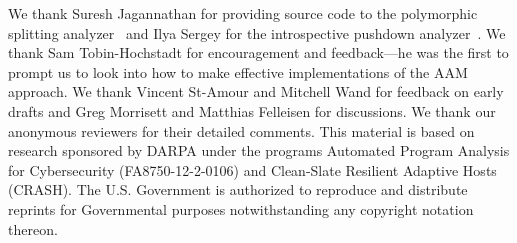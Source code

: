 \documentclass[9pt]{sigplanconf} %
\begin{document}
We thank Suresh Jagannathan for providing source code to the
polymorphic splitting
analyzer~\cite{dvanhorn:wright-jagannathan-toplas98} and Ilya Sergey
for the introspective pushdown
analyzer~\cite{dvanhorn:Earl2012Introspective}.  
%
We thank Sam Tobin-Hochstadt for encouragement and feedback---he was
the first to prompt us to look into how to make effective
implementations of the AAM approach.
%
We thank Vincent St-Amour and Mitchell Wand for feedback on early drafts
and Greg Morrisett and Matthias Felleisen for discussions.
%
We thank our anonymous reviewers for their detailed comments.
%
This material is based on research sponsored by DARPA under the
programs Automated Program Analysis for Cybersecurity
(FA8750-12-2-0106) and Clean-Slate Resilient Adaptive Hosts (CRASH).
The U.S. Government is authorized to reproduce and distribute reprints
for Governmental purposes notwithstanding any copyright notation
thereon.


\balance

%



% 
\end{document}
